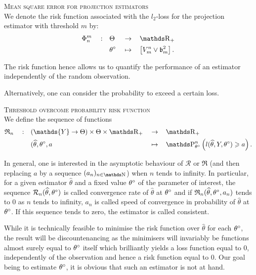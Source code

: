 \begin{Liste}[]
\begin{de}{\textsc{Mean square error for projection estimators}\\}\label{DE_INTRO_FREQ_DECISION_RISKFUNCTION_MSEPROJ}
We denote the risk function associated with the $l_{2}$-loss for the projection estimator with threshold $m$ by:
\begin{alignat*}{5}
& \Phi^{m}_{n} && : && \Theta && \rightarrow && \R_{+}\\
& && && \fxdf && \mapsto && \left[V_{m}^{n} \vee \mathfrak{b}_{m}^{2}\right].
\end{alignat*}
\end{de}

The risk function hence allows us to quantify the performance of an estimator independently of the random observation.


Alternatively, one can consider the probability to exceed a certain loss.

\begin{de}{\textsc{Threshold overcome probability risk function}\\}\label{DE_INTRO_FREQ_DECISION_RISKFUNCTION_THRESHOLDOVERCOME}
We define the sequence of functions
\begin{alignat*}{5}
& \mathfrak{R}_{n} && : && (\mathds{Y} \rightarrow \Theta) \times \Theta \times \R_{+} && \rightarrow && \R_{+}\\
& && && (\widehat{\theta}, \fxdf, a && \mapsto && \P_{\theta^{\circ}}^{n}\left(l(\widehat{\theta}, Y, \fxdf) \geq a \right).
\end{alignat*}
\end{de}

In general, one is interested in the asymptotic behaviour of $\mathcal{R}$ or $\mathfrak{R}$ (and then replacing $a$ by a sequence $(a_{n})_{n \in \N}$) when $n$ tends to infinity.
In particular, for a given estimator $\widehat{\theta}$ and a fixed value ${\theta^{\circ}_{}}$ of the parameter of interest, the sequence $\mathcal{R}_{n}(\widehat{\theta}, {\theta^{\circ}_{}})$ is called convergence rate of $\widehat{\theta}$ at ${\theta^{\circ}_{}}$ and if $\mathfrak{R}_{n}(\widehat{\theta}, {\theta^{\circ}_{}}, a_{n})$ tends to $0$ as $n$ tends to infinity, $a_{n}$ is called speed of convergence in probability of $\widehat{\theta}$ at ${\theta^{\circ}_{}}$.
If this sequence tends to zero, the estimator is called consistent.

\medskip

While it is technically feasible to minimise the risk function over $\widehat{\theta}$ for each ${\theta^{\circ}_{}}$, the result will be discountenancing as the minimisers will invariably be functions almost surely equal to ${\theta^{\circ}_{}}$ itself which brilliantly yields a loss function equal to $0$, independently of the observation and hence a risk function equal to $0$.
Our goal being to estimate ${\theta^{\circ}_{}}$, it is obvious that such an estimator is not at hand.


\end{Liste}
